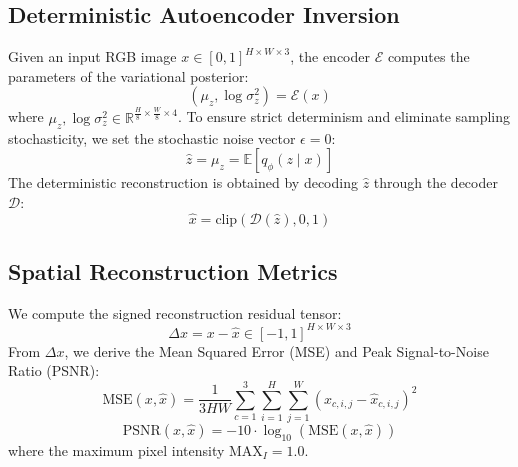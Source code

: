 \documentclass{article}
\theoremstyle{definition}
\begin{document}
\subsection{Deterministic Autoencoder Inversion}
Given an input RGB image $x \in [0, 1]^{H \times W \times 3}$, the encoder $\mathcal{E}$ computes the parameters of the variational posterior:
\begin{equation}
(\mu_z, \log \sigma_z^2) = \mathcal{E}(x)
\end{equation}
where $\mu_z, \log \sigma_z^2 \in \mathbb{R}^{\frac{H}{8} \times \frac{W}{8} \times 4}$. To ensure strict determinism and eliminate sampling stochasticity, we set the stochastic noise vector $\epsilon = 0$:
\begin{equation}
\hat{z} = \mu_z = \mathbb{E}[q_\phi(z \mid x)]
\end{equation}
The deterministic reconstruction is obtained by decoding $\hat{z}$ through the decoder $\mathcal{D}$:
\begin{equation}
\hat{x} = \text{clip}\left(\mathcal{D}(\hat{z}), 0, 1\right)
\end{equation}

\subsection{Spatial Reconstruction Metrics}
We compute the signed reconstruction residual tensor:
\begin{equation}
\Delta x = x - \hat{x} \in [-1, 1]^{H \times W \times 3}
\end{equation}
From $\Delta x$, we derive the Mean Squared Error (MSE) and Peak Signal-to-Noise Ratio (PSNR):
\begin{equation}
\text{MSE}(x, \hat{x}) = \frac{1}{3 H W} \sum_{c=1}^3 \sum_{i=1}^H \sum_{j=1}^W \left( x_{c, i, j} - \hat{x}_{c, i, j} \right)^2
\end{equation}
\begin{equation}
\text{PSNR}(x, \hat{x}) = -10 \cdot \log_{10}\left(\text{MSE}(x, \hat{x})\right)
\end{equation}
where the maximum pixel intensity $\text{MAX}_I = 1.0$.
\end{document}
